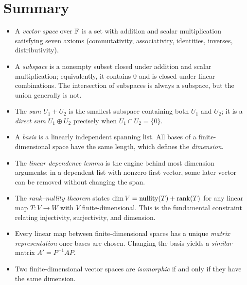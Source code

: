 \documentclass[11pt,a4paper]{article}
\begin{document}
\section{Summary}
\label{sec:summary}

\begin{itemize}
  \item A \emph{vector space} over $\mathbb{F}$ is a set with addition and scalar
        multiplication satisfying seven axioms (commutativity, associativity,
        identities, inverses, distributivity).

  \item A \emph{subspace} is a nonempty subset closed under addition and
        scalar multiplication; equivalently, it contains $0$ and is closed
        under linear combinations.  The intersection of subspaces is always
        a subspace, but the union generally is not.

  \item The \emph{sum} $U_1 + U_2$ is the smallest subspace containing both
        $U_1$ and $U_2$; it is a \emph{direct sum} $U_1 \oplus U_2$
        precisely when $U_1 \cap U_2 = \{0\}$.

  \item A \emph{basis} is a linearly independent spanning list.  All bases
        of a finite-dimensional space have the same length, which defines
        the \emph{dimension}.

  \item The \emph{linear dependence lemma} is the engine behind most
        dimension arguments: in a dependent list with nonzero first vector,
        some later vector can be removed without changing the span.

  \item The \emph{rank--nullity theorem} states
        $\dim V = \operatorname{nullity}(T) + \operatorname{rank}(T)$ for any linear map
        $T\colon V \to W$ with $V$ finite-dimensional.  This is the
        fundamental constraint relating injectivity, surjectivity, and
        dimension.

  \item Every linear map between finite-dimensional spaces has a unique
        \emph{matrix representation} once bases are chosen.  Changing the
        basis yields a \emph{similar} matrix $A' = P^{-1}AP$.

  \item Two finite-dimensional vector spaces are \emph{isomorphic} if and
        only if they have the same dimension.
\end{itemize}
\end{document}
